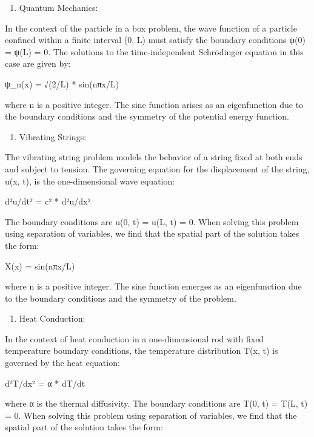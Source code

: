 \documentclass[
]{article}
\providecommand{\tightlist}{%
  \setlength{\itemsep}{0pt}\setlength{\parskip}{0pt}}
\begin{document}
\begin{enumerate}
\def\labelenumi{\arabic{enumi}.}
\tightlist
\item
  Quantum Mechanics:
\end{enumerate}

In the context of the particle in a box problem, the wave function of a
particle confined within a finite interval (0, L) must satisfy the
boundary conditions ψ(0) = ψ(L) = 0. The solutions to the
time-independent Schrödinger equation in this case are given by:

ψ\_n(x) = √(2/L) * sin(nπx/L)

where n is a positive integer. The sine function arises as an
eigenfunction due to the boundary conditions and the symmetry of the
potential energy function.

\begin{enumerate}
\def\labelenumi{\arabic{enumi}.}
\setcounter{enumi}{1}
\tightlist
\item
  Vibrating Strings:
\end{enumerate}

The vibrating string problem models the behavior of a string fixed at
both ends and subject to tension. The governing equation for the
displacement of the string, u(x, t), is the one-dimensional wave
equation:

d²u/dt² = c² * d²u/dx²

The boundary conditions are u(0, t) = u(L, t) = 0. When solving this
problem using separation of variables, we find that the spatial part of
the solution takes the form:

X(x) = sin(nπx/L)

where n is a positive integer. The sine function emerges as an
eigenfunction due to the boundary conditions and the symmetry of the
problem.

\begin{enumerate}
\def\labelenumi{\arabic{enumi}.}
\setcounter{enumi}{2}
\tightlist
\item
  Heat Conduction:
\end{enumerate}

In the context of heat conduction in a one-dimensional rod with fixed
temperature boundary conditions, the temperature distribution T(x, t) is
governed by the heat equation:

d²T/dx² = α * dT/dt

where α is the thermal diffusivity. The boundary conditions are T(0, t)
= T(L, t) = 0. When solving this problem using separation of variables,
we find that the spatial part of the solution takes the form:
\end{document}
